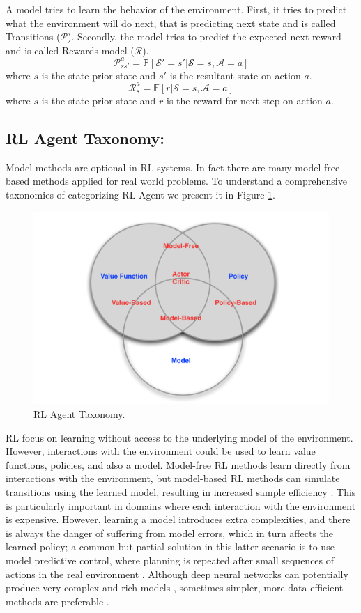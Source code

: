 A model tries to learn the behavior of the environment. First, it tries to predict what the environment will do next, that is predicting next state and is called Transitions ($\mathcal{P}$). Secondly, the model tries to predict the expected next reward and is called Rewards model ($\mathcal{R}$).
$$\mathcal{P}^a_{ss'} = \mathbb{P}[\mathcal{S}' =s'| \mathcal{S}=s, \mathcal{A} =a]$$
where $s$ is the state prior state and $s'$ is the resultant state on action $a$.
$$\mathcal{R}^a_s = \mathbb{E}[r|\mathcal{S}=s,\mathcal{A}=a]$$
where $s$ is the state prior state and $r$ is the reward for next step on action $a$.

\subsection{RL Agent Taxonomy:}
Model methods are optional in RL systems. In fact there are many model free based methods applied for real world problems. To understand a comprehensive taxonomies of categorizing RL Agent we present it in Figure \ref{fig:taxonomy}.

\begin{figure}[t]
	\includegraphics[width=0.7\linewidth ]{fig/taxonomy.png}
    \vspace{-2mm}
    \caption{RL Agent Taxonomy.}
    \label{fig:taxonomy}
\end{figure}

RL focus on learning without access to the underlying
model of the environment. However, interactions with the
environment could be used to learn value functions, policies,
and also a model. Model-free RL methods learn directly
from interactions with the environment, but model-based RL
methods can simulate transitions using the learned model,
resulting in increased sample efficiency \cite{arulkumaran2017brief}. This is particularly
important in domains where each interaction with the environment
is expensive. However, learning a model introduces extra
complexities, and there is always the danger of suffering from
model errors, which in turn affects the learned policy; a common
but partial solution in this latter scenario is to use model
predictive control, where planning is repeated after small
sequences of actions in the real environment \cite{bertsekas2005dynamic}.
Although
deep neural networks can potentially produce very complex
and rich models \cite{oh2015action, finn2016deep}, sometimes simpler, more data efficient
methods are preferable \cite{gu2016continuous}.

